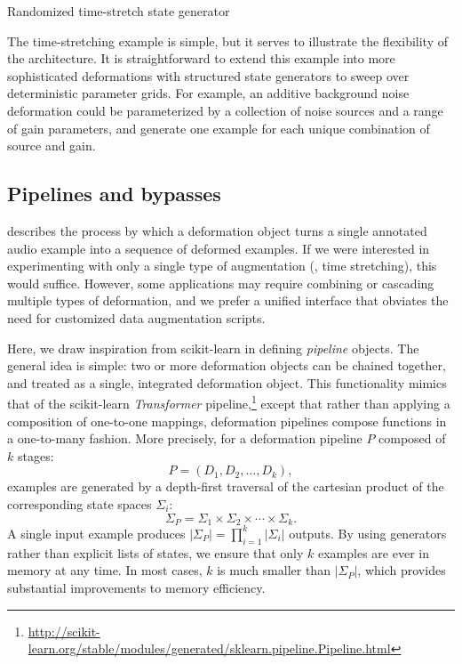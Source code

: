 \documentclass{article}
\begin{document}
\begin{algorithm}[t]
    \caption{Randomized time-stretch state generator\label{alg:timestate}}
    \begin{algorithmic}[1]
            \EndFor{}
        \EndFunction{}
    \end{algorithmic}
\end{algorithm}

The time-stretching example is simple, but it serves to illustrate the flexibility of 
the architecture.
It is straightforward to extend this example into more sophisticated deformations 
with structured state generators to sweep over deterministic parameter grids.
For example, an additive background noise deformation could be parameterized by 
a collection of noise sources and a range of gain parameters, and 
generate one example for each unique combination of source and gain.

\subsection{Pipelines and bypasses}
 describes the process by which a deformation object turns a
single annotated audio example into a sequence of deformed examples.  If we were
interested in experimenting with only a single type of augmentation (\eg, time stretching),
this would suffice.  However, some applications may require combining or cascading
multiple types of deformation, and we prefer a unified interface that obviates the
need for customized data augmentation scripts.

Here, we draw inspiration from scikit-learn in defining \emph{pipeline}
objects.  The general idea is simple: two or more deformation objects can be chained
together, and treated as a single, integrated deformation object.  This functionality
mimics that of the scikit-learn \emph{Transformer} pipeline,\footnote{\url{http://scikit-learn.org/stable/modules/generated/sklearn.pipeline.Pipeline.html}} except that rather
than applying a composition of one-to-one mappings, deformation pipelines
compose functions in a one-to-many fashion.  More precisely, for a deformation pipeline
$P$ composed of $k$ stages:
\[
P = (D_1, D_2, \dots, D_k),
\]examples are generated by a depth-first traversal of the
cartesian product of the corresponding state spaces $\Sigma_i$:
\[
\Sigma_P = \Sigma_1 \times \Sigma_2 \times \cdots \times \Sigma_k.
\]
A single input example produces $|\Sigma_P|=\prod_{i=1}^k |\Sigma_i|$ outputs.
By using generators rather than explicit lists of states, 
we ensure that only $k$ examples are ever in memory at any time.
In most cases, $k$ is much smaller than $|\Sigma_P|$, which provides substantial
improvements to memory efficiency.
\end{document}
